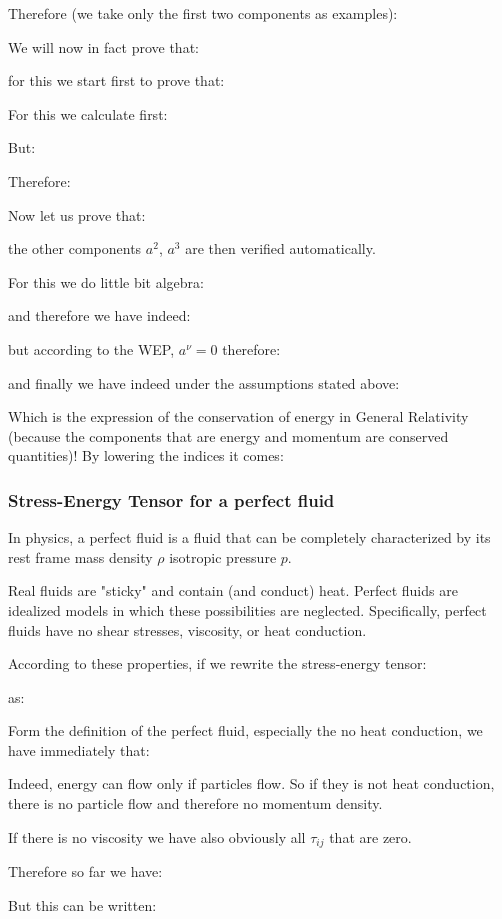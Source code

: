 	Therefore (we take only the first two components as examples):
	
	We will now in fact prove that:
	
	for this we start first to prove that:
	
	For this we calculate first:
	
	But:
	
	Therefore:
	
	Now let us prove that:
	
	the other components $a^2$, $a^3$ are then verified automatically.

	For this we do little bit algebra:
	
	and therefore we have indeed:
	
	but according to the WEP, $a^\nu=0$ therefore:
	
	and finally we have indeed under the assumptions stated above:
	
	Which is the expression of the conservation of energy in General Relativity (because the components that are energy and momentum are conserved quantities)! By lowering the indices it comes:
	
	
	\subsubsection{Stress-Energy Tensor for a perfect fluid}
	In physics, a perfect fluid is a fluid that can be completely characterized by its rest frame mass density $\rho$ isotropic pressure $p$.
	
	Real fluids are "sticky" and contain (and conduct) heat. Perfect fluids are idealized models in which these possibilities are neglected. Specifically, perfect fluids have no shear stresses, viscosity, or heat conduction.
	
	According to these properties, if we rewrite the stress-energy tensor:
	
	as:
	
	Form the definition of the perfect fluid, especially the no heat conduction, we have immediately that:
	
	Indeed, energy can flow only if particles flow. So if they is not heat conduction, there is no particle flow and therefore no momentum density.
	
	If there is no viscosity we have also obviously all $\tau_{ij}$ that are zero.
	
	Therefore so far we have:
	
	But this can be written:
	
